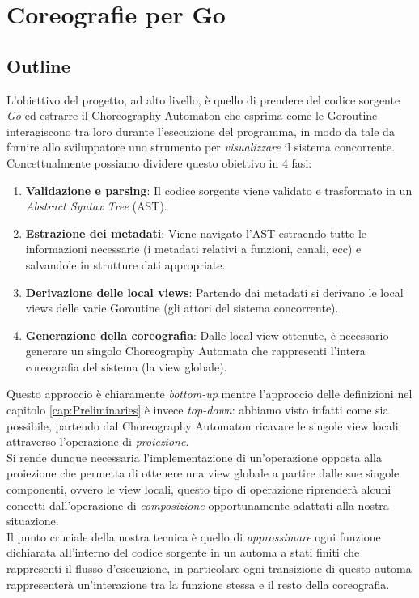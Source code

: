\chapter{Coreografie per Go}
\section{Outline} \label{sec:GoOutline}
L'obiettivo del progetto, ad alto livello, è quello di prendere del codice sorgente \emph{Go} ed estrarre il Choreography Automaton che esprima come le Goroutine interagiscono tra loro durante l'esecuzione del programma, in modo da tale da fornire allo sviluppatore uno strumento per \emph{visualizzare} il sistema concorrente.\\
Concettualmente possiamo dividere questo obiettivo in 4 fasi:
\begin{enumerate}
    \item \textbf{Validazione e parsing}: Il codice sorgente viene validato e trasformato in un \emph{Abstract Syntax Tree} (AST).
    \item \textbf{Estrazione dei metadati}: Viene navigato l'AST estraendo tutte le informazioni necessarie (i metadati relativi a funzioni, canali, ecc) e salvandole in strutture dati appropriate.
    \item \textbf{Derivazione delle local views}: Partendo dai metadati si derivano le local views delle varie Goroutine (gli attori del sistema concorrente).
    \item \textbf{Generazione della coreografia}: Dalle local view ottenute, è necessario generare un singolo Choreography Automata che rappresenti l'intera coreografia del sistema (la view globale).
\end{enumerate}
Questo approccio è chiaramente \emph{bottom-up} mentre l'approccio delle definizioni nel capitolo \ref{cap:Preliminaries} è invece \emph{top-down}: abbiamo visto infatti come sia possibile, partendo dal Choreography Automaton ricavare le singole view locali attraverso l'operazione di \emph{proiezione}.\\
Si rende dunque necessaria l'implementazione di un'operazione opposta alla proiezione che permetta di ottenere una view globale a partire dalle sue singole componenti, ovvero le view locali, questo tipo di operazione riprenderà alcuni concetti dall'operazione di \emph{composizione} opportunamente adattati alla nostra situazione. \\
Il punto cruciale della nostra tecnica è quello di \emph{approssimare} ogni funzione dichiarata all'interno del codice sorgente in un automa a stati finiti che rappresenti il flusso d'esecuzione, in particolare ogni transizione di questo automa rappresenterà un'interazione tra la funzione stessa e il resto della coreografia. \bigskip \\
